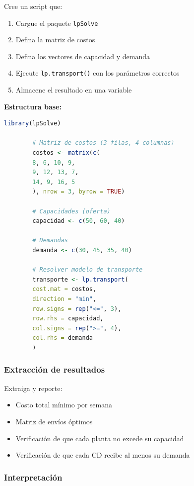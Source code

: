 \documentclass[12pt,a4paper]{article}
\begin{document}
	Cree un script que:
	
	\begin{enumerate}
		\item Cargue el paquete \texttt{lpSolve}
		\item Defina la matriz de costos
		\item Defina los vectores de capacidad y demanda
		\item Ejecute \texttt{lp.transport()} con los parámetros correctos
		\item Almacene el resultado en una variable
	\end{enumerate}
	
	\noindent \textbf{Estructura base:}
	
	\begin{lstlisting}[language=R, caption=Estructura para el modelo de transporte]
		library(lpSolve)
		
		# Matriz de costos (3 filas, 4 columnas)
		costos <- matrix(c(
		8, 6, 10, 9,
		9, 12, 13, 7,
		14, 9, 16, 5
		), nrow = 3, byrow = TRUE)
		
		# Capacidades (oferta)
		capacidad <- c(50, 60, 40)
		
		# Demandas
		demanda <- c(30, 45, 35, 40)
		
		# Resolver modelo de transporte
		transporte <- lp.transport(
		cost.mat = costos,
		direction = "min",
		row.signs = rep("<=", 3),
		row.rhs = capacidad,
		col.signs = rep(">=", 4),
		col.rhs = demanda
		)
	\end{lstlisting}
	
	\subsubsection{Extracción de resultados}
	
	Extraiga y reporte:
	
	\begin{itemize}
		\item Costo total mínimo por semana
		\item Matriz de envíos óptimos
		\item Verificación de que cada planta no excede su capacidad
		\item Verificación de que cada CD recibe al menos su demanda
	\end{itemize}
	
	\subsubsection{Interpretación}
	
\end{document}
